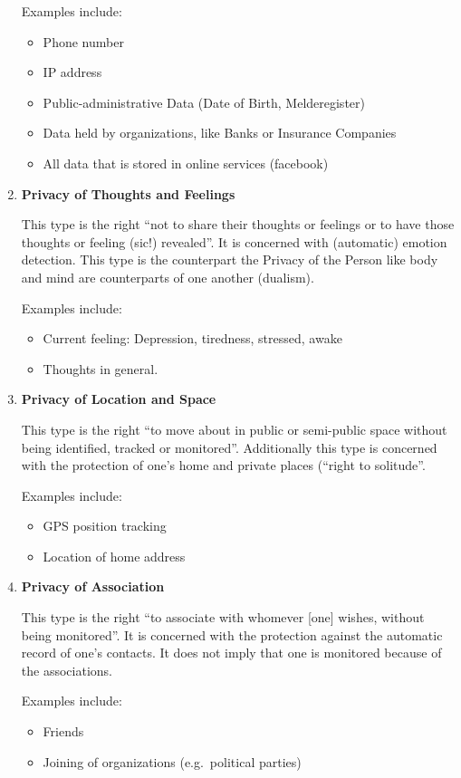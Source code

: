 \begin{enumerate}
Examples include:
\begin{itemize}
\item Phone number
\item IP address
\item Public-administrative Data (Date of Birth, Melderegister)
\item Data held by organizations, like Banks or Insurance Companies
\item All data that is stored in online services (facebook)
\end{itemize}

\item \textbf{Privacy of Thoughts and Feelings}

This type is the right ``not to share their thoughts or feelings or to have those thoughts or feeling (sic!) revealed''.
It is concerned with (automatic) emotion detection.
This type is the counterpart the Privacy of the Person like body and mind are counterparts of one another (dualism).

Examples include:
\begin{itemize}
\item Current feeling: Depression, tiredness, stressed, awake
\item Thoughts in general.
\end{itemize}

\item \textbf{Privacy of Location and Space}

This type is the right ``to move about in public or semi-public space without being identified, tracked or monitored''.
Additionally this type is concerned with the protection of one's home and private places (``right to solitude''.

Examples include:
\begin{itemize}
\item GPS position tracking
\item Location of home address
\end{itemize}

\item \textbf{Privacy of Association}

This type is the right ``to associate with whomever [one] wishes, without being monitored''.
It is concerned with the protection against the automatic record of one's contacts.
It does not imply that one is monitored because of the associations.

Examples include:
\begin{itemize}
\item Friends
\item Joining of organizations (e.g.~political parties)
\end{itemize}
\end{enumerate}

